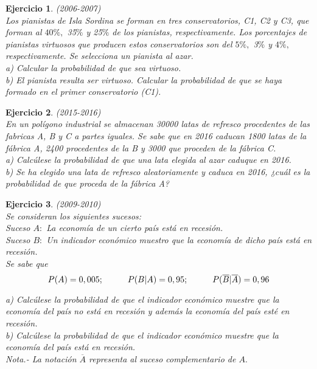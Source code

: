 \documentclass[12pt, a4paper]{amsart}
\newtheorem{ejer}{Ejercicio}
\begin{document}
\begin{ejer}\em (2006-2007)\\%
Los pianistas de Isla Sordina se forman en tres conservatorios, C1, C2 y C3, que forman al $40\%,$ 35$\%$ y 25$\%$ de los pianistas, respectivamente. Los porcentajes de pianistas virtuosos que producen estos conservatorios son del $5\%,$ 3$\%$ y $4\%,$ respectivamente. Se selecciona un pianista al azar.\\
a) Calcular la probabilidad de que sea virtuoso.\\
b) El pianista resulta ser virtuoso. Calcular la probabilidad de que se haya formado en el primer conservatorio (C1).
\end{ejer}


\begin{ejer}\em (2015-2016)\\%
En un polígono industrial se almacenan 30000 latas de refresco procedentes de las fabricas A, B y C a partes iguales. Se sabe que en 2016 caducan 1800 latas de la fábrica A, 2400 procedentes de la B y 3000 que proceden de la fábrica C.\\
a) Calcúlese la probabilidad de que una lata elegida al azar caduque en 2016.\\
b) Se ha elegido una lata de refresco aleatoriamente y caduca en 2016, ¿cuál es la probabilidad de que proceda de la fábrica A?
\end{ejer}

\begin{ejer}\em (2009-2010)\\%
Se consideran los siguientes sucesos:\\
\em Suceso $A:$ La economía de un cierto país está en recesión.\\
Suceso $B:$ Un indicador económico muestro que la economía de dicho país está en recesión.\em \\
Se sabe que
\[P(A)=0,005; \hspace*{1cm} P(B|A)=0,95; \hspace*{1cm} P(\overline{B}|\overline{A})=0,96\]

\vspace*{5mm}

a) Calcúlese la probabilidad de que el indicador económico muestre que la economía del país no está en recesión y además la economía del país esté en recesión.\\
b) Calcúlese la probabilidad de que el indicador económico muestre que la economía del país está en recesión.\\
Nota.- La notación $\overline{A}$ representa al suceso complementario de $A.$
\end{ejer}
\end{document}
